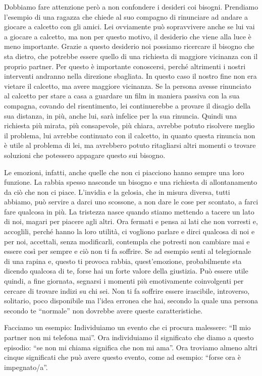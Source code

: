 \documentclass[12pt]{book} %
\begin{document}
Dobbiamo fare attenzione però a non confondere i desideri coi bisogni. Prendiamo l'esempio di una
ragazza che chiede al suo compagno di rinunciare ad andare a giocare a calcetto con gli amici. Lei ovviamente può
sopravvivere anche se lui vai a giocare a calcetto, ma non per questo motivo, il desiderio che viene alla luce è meno
importante. Grazie a questo desiderio noi possiamo ricercare il bisogno che sta dietro, che potrebbe essere quello di
una richiesta di maggiore vicinanza con il proprio partner. Per questo è importante conoscersi, perché altrimenti i nostri interventi
andranno nella direzione sbagliata. In questo caso il nostro fine non era vietare il calcetto, ma avere maggiore
vicinanza. Se la persona avesse rinunciato al calcetto per stare a casa a guardare un film in maniera passiva con la
sua compagna, covando del risentimento, lei continuerebbe a provare il disagio della sua distanza, in più, anche lui,
sarà infelice per la sua rinuncia. Quindi una richiesta più mirata, più consapevole, più chiara, avrebbe potuto
risolvere meglio il problema, lui avrebbe continuato con il calcetto, in quanto questa rinuncia non è utile al problema
di lei, ma avrebbero potuto ritagliarsi altri momenti o trovare soluzioni che potessero appagare questo sui bisogno.

Le emozioni, infatti, anche quelle che non ci piacciono hanno sempre una loro funzione. La rabbia spesso nasconde un
bisogno e una richiesta di allontanamento da ciò che non ci piace.
L'invidia e la gelosia, che in misura diversa, tutti abbiamo, può servire a darci uno scossone, a non
dare le cose per scontato, a farci fare qualcosa in più. La tristezza nasce quando stiamo mettendo a
tacere un lato di noi, magari per piacere agli altri. 
Ora fermati e pensa ai lati che non vorresti e, accoglili, perché hanno la loro utilità, ci
vogliono parlare e dirci qualcosa di noi e per noi, accettali, senza modificarli, contempla che potresti non cambiare
mai e essere così per sempre e ciò non ti fa soffrire. Se ad esempio senti al telegiornale di una rapina e, questo ti
provoca rabbia, quest'emozione, probabilmente sta dicendo qualcosa di te, forse hai un forte
valore della giustizia. Può essere utile quindi, a fine giornata, segnarsi i momenti più emotivamente coinvolgenti per
cercare di trovare indizi su chi sei. Non ti fa soffrire essere irascibile, introverso, solitario, poco disponibile ma
l'idea erronea che hai, secondo la quale una persona secondo te “normale” non dovrebbe avere queste caratteristiche.

Facciamo un esempio: Individuiamo un evento che ci procura malessere: “Il mio partner non mi telefona mai”. Ora
individuiamo il significato che diamo a questo episodio: “se non mi chiama significa che non mi ama”. Ora troviamo
almeno altri cinque significati che può avere questo evento, come ad esempio: “forse ora è impegnato/a”.
\end{document}
